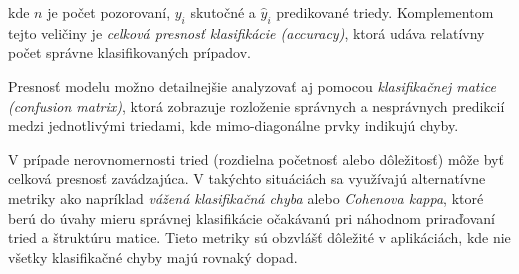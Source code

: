 kde $n$ je počet pozorovaní, $y_i$ skutočné a $\hat{y}_i$ predikované triedy. Komplementom tejto veličiny je \textit{celková presnosť klasifikácie (accuracy)}, ktorá udáva relatívny počet správne klasifikovaných prípadov.

Presnosť modelu možno detailnejšie analyzovať aj pomocou \textit{klasifikačnej matice (confusion matrix)}, ktorá zobrazuje rozloženie správnych a nesprávnych predikcií medzi jednotlivými triedami, kde mimo-diagonálne prvky indikujú chyby.

V prípade nerovnomernosti tried (rozdielna početnosť alebo dôležitosť) môže byť celková presnosť zavádzajúca. V takýchto situáciách sa využívajú alternatívne metriky ako napríklad \textit{vážená klasifikačná chyba} alebo \textit{Cohenova kappa}, ktoré berú do úvahy mieru správnej klasifikácie očakávanú pri náhodnom priraďovaní tried a štruktúru matice. Tieto metriky sú obzvlášť dôležité v aplikáciách, kde nie všetky klasifikačné chyby majú rovnaký dopad.
